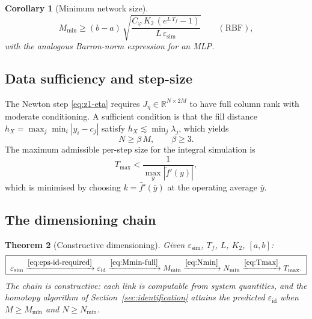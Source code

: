 \documentclass[preprint,12pt,numbers]{elsarticle}
\newtheorem{theorem}{Theorem}
\newtheorem{corollary}[theorem]{Corollary}
\begin{document}
\begin{corollary}[Minimum network size]\label{cor:Mmin}
\begin{equation}
M_{\min} \geq (b-a)\,\sqrt{\frac{C_\varphi\,K_2\,(e^{L\,T_f} - 1)}{L\,\varepsilon_{\mathrm{sim}}}}
\qquad (\text{RBF}),
\label{eq:Mmin-full}
\end{equation}
with the analogous Barron-norm expression for an MLP.
\end{corollary}

\subsection{Data sufficiency and step-size}

The Newton step \eqref{eq:z1-eta} requires $J_\eta \in \mathbb{R}^{N \times 2M}$
to have full column rank with moderate conditioning. A sufficient
condition is that the fill distance $h_X = \max_j \min_i |y_i - c_j|$
satisfy $h_X \lesssim \min_j \lambda_j$, which yields
\begin{equation}
N \geq \beta\,M, \qquad \beta \geq 3.
\label{eq:Nmin}
\end{equation}
The maximum admissible per-step size for the integral simulation is
\begin{equation}
T_{\max} < \frac{1}{\max_y |\tilde{f}'(y)|},
\label{eq:Tmax}
\end{equation}
which is minimised by choosing $k = \hat{f}'(\bar{y})$ at the operating
average $\bar{y}$.

\subsection{The dimensioning chain}

\begin{theorem}[Constructive dimensioning]\label{thm:dimensioning}
Given $\varepsilon_{\mathrm{sim}}$, $T_f$, $L$, $K_2$, $[a,b]$:
\begin{equation}
\boxed{\;\varepsilon_{\mathrm{sim}}
\xrightarrow{\eqref{eq:eps-id-required}} \varepsilon_{\mathrm{id}}
\xrightarrow{\eqref{eq:Mmin-full}} M_{\min}
\xrightarrow{\eqref{eq:Nmin}} N_{\min}
\xrightarrow{\eqref{eq:Tmax}} T_{\max}.\;}
\label{eq:chain}
\end{equation}
The chain is constructive: each link is computable from system
quantities, and the homotopy algorithm of
Section~\ref{sec:identification} attains the predicted
$\varepsilon_{\mathrm{id}}$ when $M \geq M_{\min}$ and $N \geq N_{\min}$.
\end{theorem}
\end{document}
